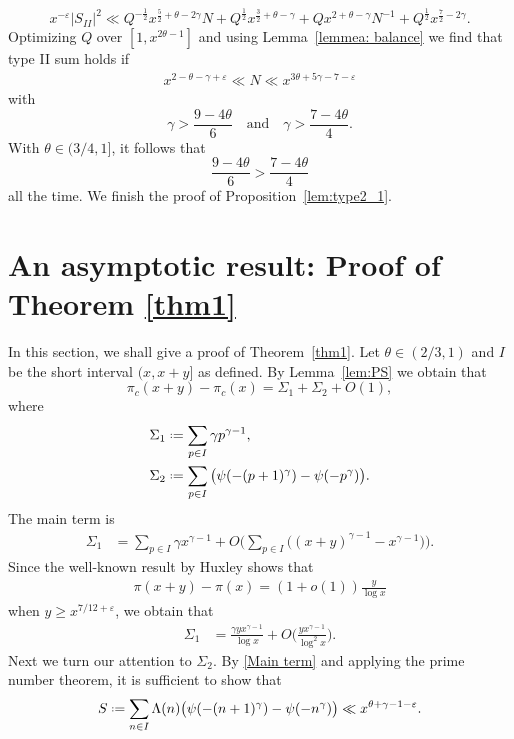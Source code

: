 \documentclass[12pt, reqno, twoside, letterpaper]{amsart}
\numberwithin{equation}{section}
\theoremstyle{customthm}
\theoremstyle{customrem}
\newcommand*{\defeq}{\mathrel{\vcenter{\baselineskip0.5ex \lineskiplimit0pt
			\hbox{\scriptsize.}\hbox{\scriptsize.}}}%
	=}
\begin{document}
$$
x^{-\varepsilon}|S_{II}|^2 \ll Q^{-\frac{1}{2}}x^{\frac{5}{2}+\theta-2\gamma}N + Q^{\frac{1}{2}}x^{\frac{3}{2}+\theta -\gamma} + Qx^{2+\theta-\gamma}N^{-1} + Q^{\frac{1}{2}}x^{\frac{7}{2}-2\gamma}.
$$
Optimizing $Q$ over $[1,x^{2\theta-1}]$ and using Lemma~\ref{lemmea: balance} we find that type II sum holds if 
\begin{align*}
x^{2-\theta-\gamma +\varepsilon}\ll N \ll x^{3\theta+5\gamma-7-\varepsilon} 
\end{align*}
with 
$$
\gamma > \frac{9-4\theta}{6} \quad \text{and} \quad \gamma > \frac{7-4\theta}{4}.
$$
With $\theta \in (3/4,1]$, it follows that
$$
\frac{9-4\theta}{6} > \frac{7-4\theta}{4}
$$
all the time. We finish the proof of Proposition~\ref{lem:type2_1}.


\section{An asymptotic result: Proof of Theorem \ref{thm1}}\label{sec:An asymptotic result}
In this section, we shall give a proof of Theorem~\ref{thm1}. Let $\theta\in (2/3,1)$ and $I$ be the short interval $(x,x+y]$ as defined. By Lemma~\ref{lem:PS} we obtain that
$$
\pi_{c}(x+y) - \pi_{c}(x) = \Sigma_1 + \Sigma_2 + O(1),
$$
where
\begin{align*}
&\Sigma_1 \defeq \sum_{\substack{ p \in I }} \gamma  p^{\gamma-1}, \\
&\Sigma_2 \defeq \sum_{\substack{ p \in I }} \big( \psi(-(p+1)^{\gamma}) - \psi(-p^{\gamma}) \big).
\end{align*}
The main term is
\begin{align}
\nonumber \Sigma_1 &= \sum_{p \in I}\gamma x^{\gamma-1} + O\Big( \sum_{p \in I} \big((x+y)^{\gamma-1} -x^{\gamma-1}\big) \Big).
\end{align}
Since the well-known result by Huxley \cite{Hux} shows that 
\begin{align*}
	\pi(x+y)-\pi(x)=(1+o(1))\frac{y}{\log x}
\end{align*}
when $y \geqslant x^{7/12+\varepsilon}$, we obtain that
\begin{align}\label{Main term}
\Sigma_1 &= \frac{\gamma yx^{\gamma-1}}{\log x} + O\Big(\frac{yx^{\gamma-1}}{\log^2 x}\Big).
\end{align}
Next we turn our attention to $\Sigma_2$. By \eqref{Main term} and applying the prime number theorem, it is sufficient to show that
\begin{align*}
S \defeq \sum_{\substack{ n \in I }} \Lambda(n) \big( \psi(-(n+1)^{\gamma}) - \psi(-n^{\gamma}) \big) \ll x^{\theta + \gamma - 1 - \varepsilon}.
\end{align*}
\end{document}
